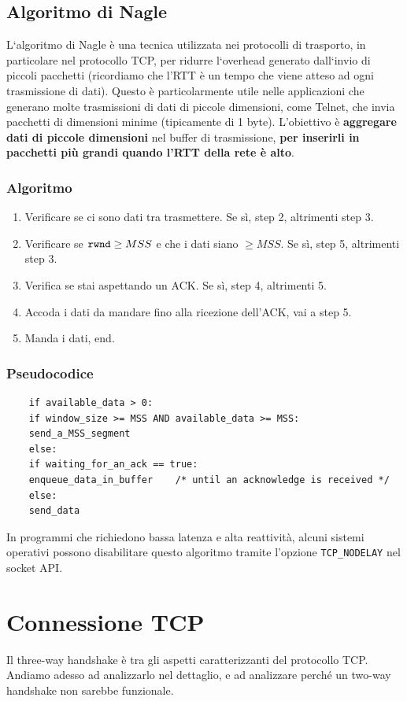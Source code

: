 \subsection{Algoritmo di Nagle}
L‘algoritmo di Nagle è una tecnica utilizzata nei protocolli di trasporto, in particolare nel protocollo TCP, per ridurre l‘overhead generato dall‘invio di piccoli pacchetti (ricordiamo che l'RTT è un tempo che viene atteso ad ogni trasmissione di dati). 
Questo è particolarmente utile nelle applicazioni che generano molte trasmissioni di dati di piccole dimensioni, come Telnet, che invia pacchetti di dimensioni minime (tipicamente di 1 byte).
L'obiettivo è \textbf{aggregare dati di piccole dimensioni} nel buffer di trasmissione, \textbf{per inserirli in pacchetti più grandi quando l'RTT della rete è alto}.

\subsubsection{Algoritmo}
\begin{enumerate}
	\item Verificare se ci sono dati tra trasmettere. Se sì, step 2, altrimenti step 3.
	\item Verificare se $\verb|rwnd| \geq MSS$ e che i dati siano $\geq MSS$. Se sì, step 5, altrimenti step 3.
	\item Verifica se stai aspettando un ACK. Se sì, step 4, altrimenti 5.
	\item Accoda i dati da mandare fino alla ricezione dell'ACK, vai a step 5.
	\item Manda i dati, end.
\end{enumerate}

\subsubsection{Pseudocodice}
\begin{verbatim}
	if available_data > 0:
	if window_size >= MSS AND available_data >= MSS:
	send_a_MSS_segment
	else:
	if waiting_for_an_ack == true:
	enqueue_data_in_buffer    /* until an acknowledge is received */
	else:
	send_data
\end{verbatim}

In programmi che richiedono bassa latenza e alta reattività, alcuni sistemi operativi possono disabilitare questo algoritmo tramite l'opzione \verb|TCP_NODELAY| nel socket API.


\section{Connessione TCP}
Il three-way handshake è tra gli aspetti caratterizzanti del protocollo TCP. Andiamo adesso ad analizzarlo nel dettaglio, e ad analizzare perché un two-way handshake non sarebbe funzionale.

